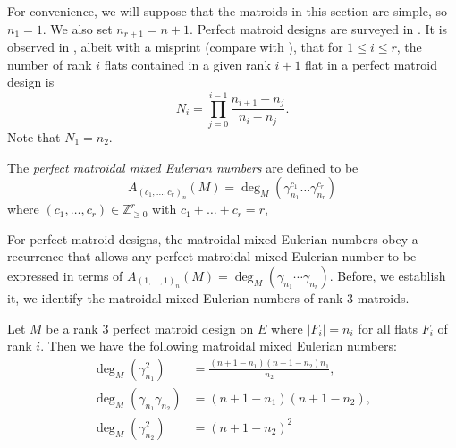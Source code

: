 \documentclass[ALCO,published]{cedram}
\numberwithin{equation}{section}
\numberwithin{figure}{section}
\newcommand{\Z}{\mathbb{Z}}
\begin{document}
For convenience, we will suppose that the matroids in this section are simple, so $n_1=1$. We also set $n_{r+1} = n+1$.
Perfect matroid designs are surveyed in \cite{Deza:PMD}. It is observed in \cite[Proposition~2.2.3]{Deza:PMD}, albeit with a misprint (compare with \cite{DezaSinghi}), that for $1\leq i\leq r$, the number of rank $i$ flats contained in a given rank $i+1$ flat in a perfect matroid design is
\[N_i=\prod_{j=0}^{i-1}\frac{n_{i+1}-n_j}{n_i-n_j}.\]
Note that $N_1=n_2$.

\begin{defi}
    The {\em perfect matroidal mixed Eulerian numbers} are defined to be
    \[A_{(c_1,\dots,c_r)_n}(M)=\deg_M(\gamma_{n_1}^{c_1}\dots\gamma_{n_r}^{c_r})\]
    where $(c_1,\dots,c_r)\in\Z_{\geq 0}^r$ with $c_1+\dots+c_r=r$,
\end{defi}

For perfect matroid designs, the matroidal mixed Eulerian  numbers obey a recurrence that allows any perfect matroidal mixed Eulerian number to be expressed in terms of $A_{(1,\dots,1)_n}(M) = \deg_M(\gamma_{n_1} \cdots \gamma_{n_r})$. Before, we establish it, we identify the matroidal mixed Eulerian numbers of rank $3$ matroids.

\begin{lemma} \label{l:rank3uniform}
    Let $M$ be a rank $3$ perfect matroid design on $E$ where $|F_i|=n_i$ for all flats $F_i$ of rank $i$. Then we have the following matroidal mixed Eulerian numbers:
    \begin{align}
      \label{eq:n1n1} \deg_M(\gamma_{n_1}^2)&=\frac{(n+1-n_1)(n+1-n_2)n_1}{n_2},\\
      \label{eq:n1n2} \deg_M(\gamma_{n_1}\gamma_{n_2})&=(n+1-n_1)(n+1-n_2),\\
      \label{eq:n2n2} \deg_M(\gamma_{n_2}^2)&=(n+1-n_2)^2
    \end{align}
\end{lemma}
\end{document}
